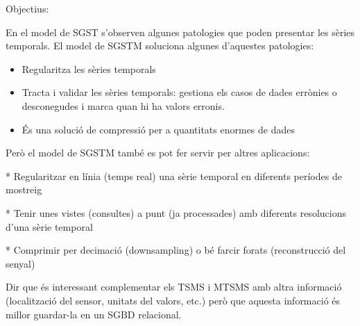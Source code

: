 Objectius:

En el model de SGST s'observen algunes patologies que poden presentar les sèries temporals. El model de SGSTM soluciona algunes d'aquestes patologies:

\begin{itemize}
\item Regularitza les sèries temporals
\item Tracta i validar les sèries temporals: gestiona els casos de dades errònies o desconegudes i marca quan hi ha valors erronis.
\item És una solució de compressió per a quantitats enormes de dades
\end{itemize}


Però el model de SGSTM també es pot fer servir per altres aplicacions:

* Regularitzar en línia (temps real) una sèrie temporal en diferents períodes de mostreig

* Tenir unes vistes (consultes) a punt (ja processades) amb diferents resolucions d'una sèrie temporal

* Comprimir per decimació (downsampling) o bé farcir forats (reconstrucció del senyal)


Dir que és interessant complementar els TSMS i MTSMS amb altra informació (localització del sensor, unitats del valors, etc.) però que aquesta informació és millor guardar-la en un SGBD relacional.




